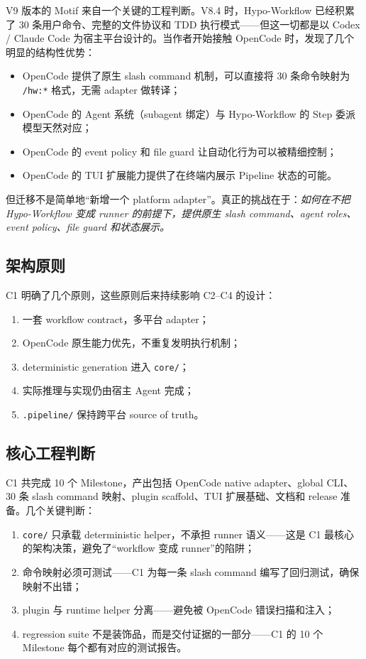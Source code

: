 \documentclass[
  outputdir=build,
  chapterstyle=cn,
  colorscheme=Simple,
  fontset=tech,
  code=false
]{Hypo-Note}
\begin{document}
V9 版本的 Motif 来自一个关键的工程判断。V8.4 时，Hypo-Workflow 已经积累了 30 条用户命令、完整的文件协议和 TDD 执行模式——但这一切都是以 Codex / Claude Code 为宿主平台设计的。当作者开始接触 OpenCode 时，发现了几个明显的结构性优势：

\begin{itemize}[leftmargin=2em]
  \item OpenCode 提供了原生 slash command 机制，可以直接将 30 条命令映射为 \texttt{/hw:*} 格式，无需 adapter 做转译；
  \item OpenCode 的 Agent 系统（subagent 绑定）与 Hypo-Workflow 的 Step 委派模型天然对应；
  \item OpenCode 的 event policy 和 file guard 让自动化行为可以被精细控制；
  \item OpenCode 的 TUI 扩展能力提供了在终端内展示 Pipeline 状态的可能。
\end{itemize}

但迁移不是简单地“新增一个 platform adapter”。真正的挑战在于：\emph{如何在不把 Hypo-Workflow 变成 runner 的前提下，提供原生 slash command、agent roles、event policy、file guard 和状态展示。}

\subsection{架构原则}

C1 明确了几个原则，这些原则后来持续影响 C2–C4 的设计：

\begin{enumerate}[leftmargin=2em]
  \item 一套 workflow contract，多平台 adapter；
  \item OpenCode 原生能力优先，不重复发明执行机制；
  \item deterministic generation 进入 \texttt{core/}；
  \item 实际推理与实现仍由宿主 Agent 完成；
  \item \texttt{.pipeline/} 保持跨平台 source of truth。
\end{enumerate}

\subsection{核心工程判断}

C1 共完成 10 个 Milestone，产出包括 OpenCode native adapter、global CLI、30 条 slash command 映射、plugin scaffold、TUI 扩展基础、文档和 release 准备。几个关键判断：

\begin{enumerate}[leftmargin=2em]
  \item \texttt{core/} 只承载 deterministic helper，不承担 runner 语义——这是 C1 最核心的架构决策，避免了“workflow 变成 runner”的陷阱；
  \item 命令映射必须可测试——C1 为每一条 slash command 编写了回归测试，确保映射不出错；
  \item plugin 与 runtime helper 分离——避免被 OpenCode 错误扫描和注入；
  \item regression suite 不是装饰品，而是交付证据的一部分——C1 的 10 个 Milestone 每个都有对应的测试报告。
\end{enumerate}
\end{document}
